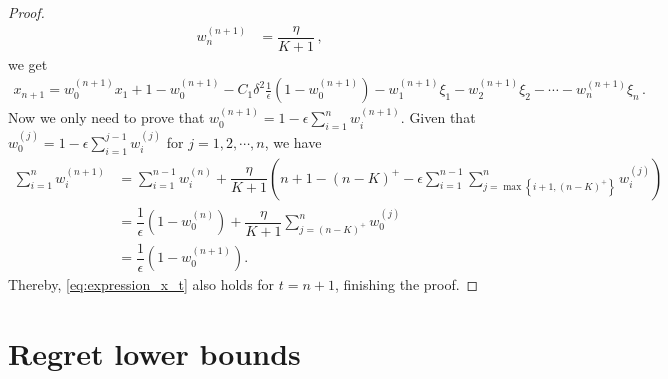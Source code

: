 \documentclass[11pt,letterpaper,english]{article}
\begin{document}
\begin{proof}
\begin{align*}
w^{(n+1)}_n &=\dfrac{\eta}{K+1} \,,
\end{align*}
we get 
\begin{align*}
x_{n+1} = w^{(n+1)}_0 x_1 + 1-w^{(n+1)}_0 -C_1 \delta^2 \frac{1}{\epsilon}(1-w^{(n+1)}_0) -w^{(n+1)}_1 \xi_1 - w^{(n+1)}_2 \xi_2 - \cdots - w^{(n+1)}_{n} \xi_{n} \,.
\end{align*}
Now we only need to prove that $w^{(n+1)}_0=1-\epsilon \sum_{i=1}^n w^{(n+1)}_i$. Given that $w^{(j)}_0=1-\epsilon \sum_{i=1}^{j-1} w^{(j)}_i$ for $j=1,2,\cdots,n$, we have
\begin{align*}
 \sum_{i=1}^n w^{(n+1)}_i
&=  \sum_{i=1}^{n-1} w^{(n)}_i +\dfrac{\eta}{K+1} \left( n+1-(n-K)^+ -\epsilon  \sum_{i=1}^{n-1} \sum_{j=\max \left\{i+1,(n-K)^+\right\}}^n w^{(j)}_i \right) \\
&= \dfrac{1}{\epsilon} \left( 1-w^{(n)}_0 \right) + \dfrac{\eta}{K+1}  \sum_{j=(n-K)^+}^n w^{(j)}_0  \\
&=  \dfrac{1}{\epsilon} \left( 1-w^{(n+1)}_0 \right) .
\end{align*}
Thereby, \eqref{eq:expression_x_t} also holds for $t=n+1$, finishing the proof.
\end{proof}



\section{Regret lower bounds}
\end{document}

